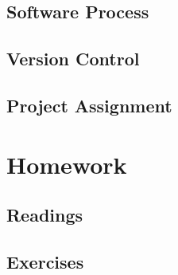 \documentclass{article}
\begin{document}
        \subsection{Software Process}

        
        \subsection{Version Control}


        \subsection{Project Assignment}

    \section{Homework}


        \subsection{Readings}

        
        \subsection{Exercises}
\end{document}
